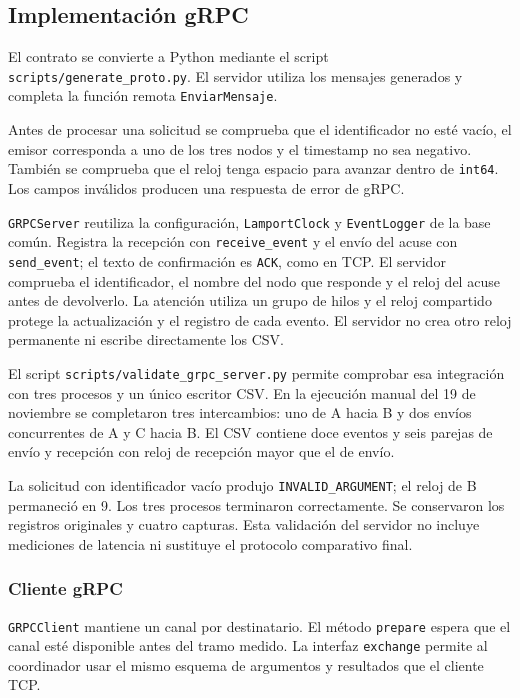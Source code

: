 \subsection{Implementación gRPC}
El contrato se convierte a Python mediante el script
\texttt{scripts/generate\_proto.py}. El servidor utiliza los mensajes generados
y completa la función remota \texttt{EnviarMensaje}.

Antes de procesar una solicitud se comprueba que el identificador no esté vacío,
el emisor corresponda a uno de los tres nodos y el timestamp no sea negativo.
También se comprueba que el reloj tenga espacio para avanzar dentro de
\texttt{int64}. Los campos inválidos producen una respuesta de error de gRPC.

\texttt{GRPCServer} reutiliza la configuración,
\texttt{LamportClock} y \texttt{EventLogger} de la base común. Registra la recepción
con \texttt{receive\_event} y el envío del acuse con \texttt{send\_event}; el texto
de confirmación es \texttt{ACK}, como en TCP.
El servidor comprueba el identificador, el nombre del nodo que responde y el reloj
del acuse antes de devolverlo. La atención utiliza un grupo de hilos y el reloj
compartido protege la actualización y el registro de cada evento.
El servidor no crea otro reloj permanente ni escribe directamente los CSV.

El script \texttt{scripts/validate\_grpc\_server.py} permite comprobar esa
integración con tres procesos y un único escritor CSV. En la ejecución manual
del 19 de noviembre se completaron tres intercambios: uno de A hacia B y dos
envíos concurrentes de A y C hacia B. El CSV contiene doce eventos y seis parejas
de envío y recepción con reloj de recepción mayor que el de envío.

La solicitud con identificador vacío produjo \texttt{INVALID\_ARGUMENT}; el reloj
de B permaneció en 9. Los tres procesos terminaron correctamente. Se conservaron
los registros originales y cuatro capturas. Esta validación del servidor no
incluye mediciones de latencia ni sustituye el protocolo comparativo final.

\subsubsection{Cliente gRPC}
\texttt{GRPCClient} mantiene un canal por destinatario. El método
\texttt{prepare} espera que el canal esté disponible antes del tramo medido.
La interfaz \texttt{exchange} permite al coordinador usar el mismo esquema de
argumentos y resultados que el cliente TCP.

